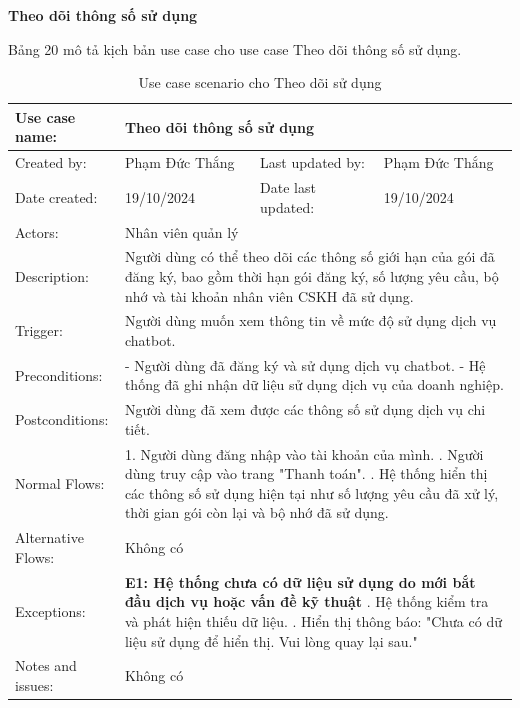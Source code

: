 \textbf{Theo dõi thông số sử dụng}

Bảng 20 mô tả kịch bản use case cho use case Theo dõi thông số sử dụng.

\begin{table}[H]
\centering
\begin{tabular}{|l|l|l|l|}
\hline
Use case name: & \multicolumn{3}{|l|}{Theo dõi thông số sử dụng} \\
\hline
Created by: & Phạm Đức Thắng & Last updated by: & Phạm Đức Thắng \\
\hline
Date created: & 19/10/2024 & Date last updated: & 19/10/2024 \\
\hline
Actors: & \multicolumn{3}{|l|}{Nhân viên quản lý} \\
\hline
Description: & \multicolumn{3}{|p{12cm}|}{Người dùng có thể theo dõi các thông số giới hạn của gói đã đăng ký, bao gồm thời hạn gói đăng ký, số lượng yêu cầu, bộ nhớ và tài khoản nhân viên CSKH đã sử dụng.} \\
\hline
Trigger: & \multicolumn{3}{|p{12cm}|}{Người dùng muốn xem thông tin về mức độ sử dụng dịch vụ chatbot.} \\
\hline
Preconditions: & \multicolumn{3}{|p{12cm}|}{
- Người dùng đã đăng ký và sử dụng dịch vụ chatbot. \newline
- Hệ thống đã ghi nhận dữ liệu sử dụng dịch vụ của doanh nghiệp.
} \\
\hline
Postconditions: & \multicolumn{3}{|p{12cm}|}{Người dùng đã xem được các thông số sử dụng dịch vụ chi tiết.} \\
\hline
Normal Flows: & \multicolumn{3}{|p{12cm}|}{
1. Người dùng đăng nhập vào tài khoản của mình. \newline
2. Người dùng truy cập vào trang "Thanh toán". \newline
3. Hệ thống hiển thị các thông số sử dụng hiện tại như số lượng yêu cầu đã xử lý, thời gian gói còn lại và bộ nhớ đã sử dụng.
}\\
\hline
Alternative Flows: & \multicolumn{3}{|p{12cm}|}{Không có} \\
\hline
Exceptions: & \multicolumn{3}{|p{12cm}|}{
\textbf{E1: Hệ thống chưa có dữ liệu sử dụng do mới bắt đầu dịch vụ hoặc vấn đề kỹ thuật} \newline
5.1. Hệ thống kiểm tra và phát hiện thiếu dữ liệu. \newline
5.2. Hiển thị thông báo: "Chưa có dữ liệu sử dụng để hiển thị. Vui lòng quay lại sau."
} \\
\hline
Notes and issues: & \multicolumn{3}{|p{12cm}|}{Không có} \\
\hline
\end{tabular}
\caption{Use case scenario cho Theo dõi sử dụng}
\end{table}

